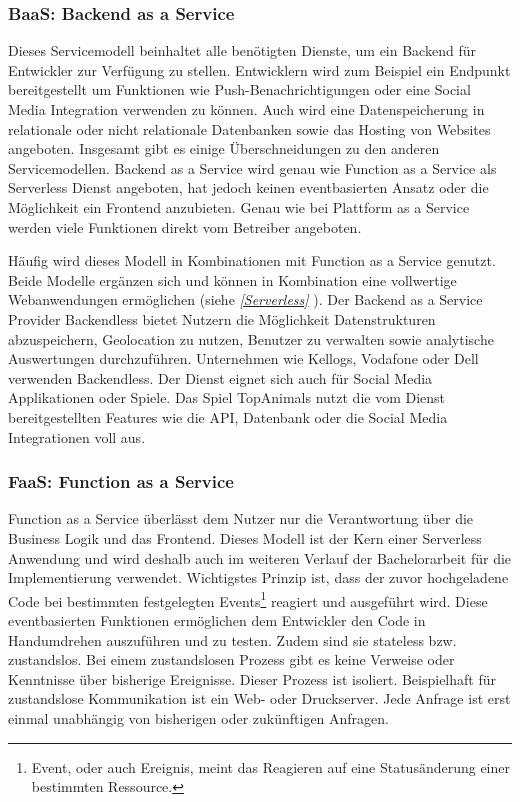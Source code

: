    \subsubsection{BaaS: Backend as a Service}
   Dieses Servicemodell beinhaltet alle benötigten Dienste, um ein Backend für Entwickler zur Verfügung zu stellen.
   Entwicklern wird zum Beispiel ein Endpunkt bereitgestellt um Funktionen wie Push-Benachrichtigungen oder eine Social Media Integration verwenden zu können.
   Auch wird eine Datenspeicherung in relationale oder nicht relationale Datenbanken sowie das Hosting von Websites angeboten. Insgesamt gibt es einige Überschneidungen zu den anderen Servicemodellen.
   Backend as a Service wird genau wie Function as a Service als Serverless Dienst angeboten, hat jedoch keinen eventbasierten Ansatz oder die Möglichkeit ein Frontend anzubieten.
   Genau wie bei Plattform as a Service werden viele Funktionen direkt vom Betreiber angeboten.

   Häufig wird dieses Modell in Kombinationen mit Function as a Service genutzt. Beide Modelle ergänzen sich und können in Kombination eine vollwertige
   Webanwendungen ermöglichen (siehe \textit{\ref{Serverless} }).
   Der Backend as a Service Provider Backendless bietet Nutzern die Möglichkeit Datenstrukturen abzuspeichern, Geolocation zu nutzen,
   Benutzer zu verwalten sowie analytische Auswertungen durchzuführen. Unternehmen wie Kellogs, Vodafone oder Dell verwenden Backendless.
   Der Dienst eignet sich auch für Social Media Applikationen oder Spiele. Das Spiel TopAnimals nutzt die vom Dienst bereitgestellten Features wie
   die API, Datenbank oder die Social Media Integrationen voll aus. \cite[]{Backendless}


   \subsubsection{FaaS: Function as a Service}
   \label{FaaS}
   Function as a Service überlässt dem Nutzer nur die Verantwortung über die Business Logik und das Frontend.
   Dieses Modell ist der Kern einer Serverless Anwendung und wird deshalb auch im weiteren Verlauf der Bachelorarbeit für die Implementierung verwendet.
   Wichtigstes Prinzip ist, dass der zuvor hochgeladene Code bei bestimmten festgelegten Events\footnote{Event, oder auch Ereignis, meint das Reagieren auf eine Statusänderung einer bestimmten Ressource.} reagiert und ausgeführt wird.
   Diese eventbasierten Funktionen ermöglichen dem Entwickler den Code in Handumdrehen auszuführen und zu testen.
   Zudem sind sie stateless bzw. zustandslos. Bei einem zustandslosen Prozess gibt es keine Verweise oder Kenntnisse über bisherige Ereignisse.
   Dieser Prozess ist isoliert. Beispielhaft für zustandslose Kommunikation ist ein Web- oder Druckserver.
   Jede Anfrage ist erst einmal unabhängig von bisherigen oder zukünftigen Anfragen.\cite[]{Zustandslos}


